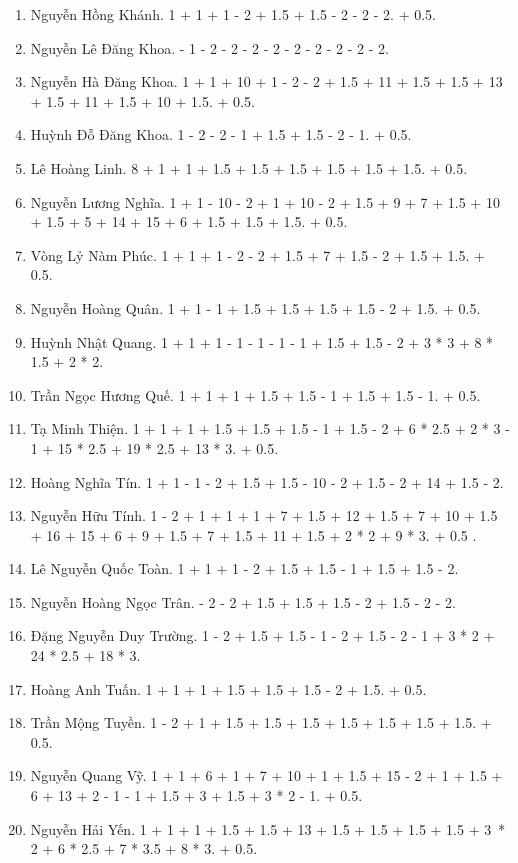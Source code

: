 \documentclass{article}
\begin{document}
\begin{enumerate}
	\item {\sc Nguyễn Hồng Khánh.} 1 + 1 + 1 - 2 + 1.5 + 1.5 - 2 - 2 - 2. + 0.5.
	\item {\sc Nguyễn Lê Đăng Khoa.} - 1 - 2 - 2 - 2 - 2 - 2 - 2 - 2 - 2 - 2.
	\item {\sc Nguyễn Hà Đăng Khoa.} 1 + 1 + 10 + 1 - 2 - 2 + 1.5 + 11 + 1.5 + 1.5 + 13 + 1.5 + 11 + 1.5 + 10 + 1.5. + 0.5.
	\item {\sc Huỳnh Đỗ Đăng Khoa.} 1 - 2 - 2 - 1 + 1.5 + 1.5 - 2 - 1. + 0.5.
	\item {\sc Lê Hoàng Linh.} 8 + 1 + 1 + 1.5 + 1.5 + 1.5 + 1.5 + 1.5 + 1.5. + 0.5.
	\item {\sc Nguyễn Lương Nghĩa.} 1 + 1 - 10 - 2 + 1 + 10 - 2 + 1.5 + 9 + 7 + 1.5 + 10 + 1.5 + 5 + 14 + 15 + 6 + 1.5 + 1.5 + 1.5. + 0.5.
	\item {\sc Vòng Lỷ Nàm Phúc.} 1 + 1 + 1 - 2 - 2 + 1.5 + 7 + 1.5 - 2 + 1.5 + 1.5. + 0.5.
	\item {\sc Nguyễn Hoàng Quân.} 1 + 1 - 1 + 1.5 + 1.5 + 1.5 + 1.5 - 2 + 1.5. + 0.5.
	\item {\sc Huỳnh Nhật Quang.} 1 + 1 + 1 - 1 - 1 - 1 - 1 + 1.5 + 1.5 - 2 + 3 * 3 + 8 * 1.5 + 2 * 2.
	\item {\sc Trần Ngọc Hương Quế.} 1 + 1 + 1 + 1.5 + 1.5 - 1 + 1.5 + 1.5 - 1. + 0.5.
	\item {\sc Tạ Minh Thiện.} 1 + 1 + 1 + 1.5 + 1.5 + 1.5 - 1 + 1.5 - 2 + 6 * 2.5 + 2 * 3 - 1 + 15 * 2.5 + 19 * 2.5 + 13 * 3. + 0.5.
	\item {\sc Hoàng Nghĩa Tín.} 1 + 1 - 1 - 2 + 1.5 + 1.5 - 10 - 2 + 1.5 - 2 + 14 + 1.5 - 2.
	\item {\sc Nguyễn Hữu Tính.} 1 - 2 + 1 + 1 + 1 + 7 + 1.5 + 12 + 1.5 + 7 + 10 + 1.5 + 16 + 15 + 6 + 9 + 1.5 + 7 + 1.5 + 11 + 1.5 + 2 * 2 + 9 * 3. + 0.5 .
	\item {\sc Lê Nguyễn Quốc Toàn.} 1 + 1 + 1 - 2 + 1.5 + 1.5 - 1 + 1.5 + 1.5 - 2.
	\item {\sc Nguyễn Hoàng Ngọc Trân.} - 2 - 2 + 1.5 + 1.5 + 1.5 - 2 + 1.5 - 2 - 2.
	\item {\sc Đặng Nguyễn Duy Trường.} 1 - 2 + 1.5 + 1.5 - 1 - 2 + 1.5 - 2 - 1 + 3 * 2 + 24 * 2.5 + 18 * 3.
	\item {\sc Hoàng Anh Tuấn.} 1 + 1 + 1 + 1.5 + 1.5 + 1.5 - 2 + 1.5. + 0.5.
	\item {\sc Trần Mộng Tuyền.} 1 - 2 + 1 + 1.5 + 1.5 + 1.5 + 1.5 + 1.5 + 1.5 + 1.5. + 0.5.
	\item {\sc Nguyễn Quang Vỹ.} 1 + 1 + 6 + 1 + 7 + 10 + 1 + 1.5 + 15 - 2 + 1 + 1.5 + 6 + 13 + 2 - 1 - 1 + 1.5 + 3 + 1.5 + 3 * 2 - 1. + 0.5.
	\item {\sc Nguyễn Hải Yến.} 1 + 1 + 1 + 1.5 + 1.5 + 13 + 1.5 + 1.5 + 1.5 + 1.5 + 3 * 2 + 6 * 2.5 + 7 * 3.5 + 8 * 3. + 0.5.
\end{enumerate}
\end{document}
